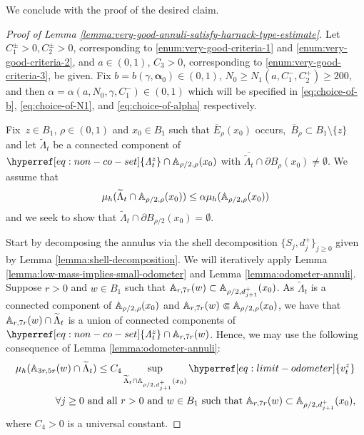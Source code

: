 \documentclass[12pt]{amsart}
\numberwithin{equation}{section}
\newcommand{\cluster}[2]{\hyperref[eq:non-co-set]{\mathit{\Lambda}^{#1}_{#2}}}
\newcommand{\odometer}[2]{\hyperref[eq:limit-odometer]{v^{#1}_{#2}}}
\begin{document}
	
	
	
	We conclude with the proof of the desired claim. 
	
	
	
	
	
	\begin{proof}[Proof of Lemma \ref{lemma:very-good-annuli-satisfy-harnack-type-estimate}]
		Let $C^{\pm}_1 > 0, C^{\pm}_2 >0$, corresponding to \ref{enum:very-good-criteria-1} and \ref{enum:very-good-criteria-2},
		and $a \in (0,1)$, $C_3 > 0$, corresponding to \ref{enum:very-good-criteria-3}, be given.  Fix $b = b(\gamma,\boldsymbol{\alpha}_0) \in (0,1)$, $N_0 \geq N_1(a,C^-_1, C^+_2) \geq 200$, and then $\alpha = \alpha(a, N_0, \gamma, C^-_1) \in (0,1)$ which will be specified 
		in \eqref{eq:choice-of-b}, \eqref{eq:choice-of-N1}, and \eqref{eq:choice-of-alpha} respectively. 
		
		
		Fix~$z \in B_1$, $\rho \in (0,1)$ and $x_0 \in B_1$ such that $\overline E_\rho(x_0)$ occurs,~$\overline{B}_{\rho} \subset B_1 \setminus \{z\}$ and let $\widetilde \Lambda_t$ be a connected component of ${\cluster{z}{t}} \cap \A_{\rho/2, \rho}(x_0)$ with $\overline{\widetilde \Lambda_t} \cap \partial B_{\rho}(x_0) \neq \emptyset$. We assume that
		\begin{equation} \label{eq:ind-assumption}
		\mu_h(\widetilde{\Lambda}_t \cap \mathbb{A}_{\rho/2, \rho}(x_0)) \leq \alpha \mu_h(\mathbb{A}_{\rho/2, \rho}(x_0)) 
		\end{equation}
		and we seek to show that $\widetilde{\Lambda}_t \cap \partial B_{\rho/2}(x_0) = \emptyset$.
		
		Start by decomposing the annulus via the shell decomposition  $\{S_j, d^+_j\}_{j \geq 0}$ given by Lemma \ref{lemma:shell-decomposition}.
		We will iteratively apply Lemma \ref{lemma:low-mass-implies-small-odometer} and Lemma \ref{lemma:odometer-annuli}. 
		Suppose $r>0$ and $w \in B_1$ such that $\mathbb{A}_{r,7r}(w) \subset \mathbb{A}_{\rho/2, d^+_{j+1}}(x_0)$.
		As $\widetilde \Lambda_t$ is a connected component of $\mathbb{A}_{\rho/2,\rho}(x_0)$ and $\mathbb{A}_{r,7r}(w) \Subset \mathbb{A}_{\rho/2,\rho}(x_0)$, we have that $\mathbb{A}_{r, 7r}(w) \cap \widetilde \Lambda_t$ is a union of connected components of ${\cluster{z}{t}} \cap \A_{r, 7r}(w)$. Hence, we may use the following consequence of Lemma \ref{lemma:odometer-annuli}: 
		\begin{align} \label{eq:small-odometer-implies-low-mass}
		&\mu_h(\A_{3r, 5r}(w) \cap \widetilde \Lambda_t) \leq C_4 \sup_{\widetilde \Lambda_t \cap \A_{\rho/2, d^+_{j+1}}(x_0)} \odometer{z}{t} \notag\\
		&\qquad\qquad \forall j \geq 0 \mbox{ and all $r>0$ and $w\in B_1$ such that } \A_{r, 7r}(w) \subset \A_{\rho/2, d^+_{j+1}}(x_0),
		\end{align}
		where $C_4 > 0$ is a universal constant.
		

\end{proof}
\end{document}
